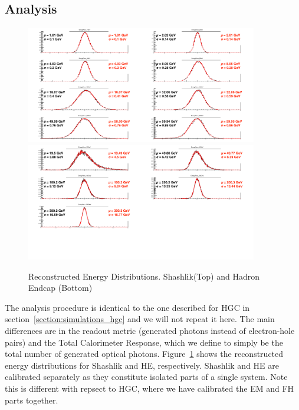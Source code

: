 \subsection{Analysis}
\begin{figure}[!h]
    \centering
    \includegraphics[width=0.9\textwidth]{figures/ch_simulations/shashlik/performance/EnergyRecoDistributions.png}
    \includegraphics[width=0.9\textwidth]{figures/ch_simulations/he/performance/EnergyRECODistributions.png}
    \caption{Reconstructed Energy Distributions. Shashlik(Top) and Hadron Endcap (Bottom)}
    \label{fig:simulations_shashlikhe_energyreco}
 \end{figure}
The analysis procedure is identical to the one described for HGC in section~\ref{section:simulations_hgc} and we will not repeat it here. The main differences are in the readout metric (generated photons instead of electron-hole pairs) and the Total Calorimeter Response, which we define to simply be the total number of generated optical photons. Figure~\ref{fig:simulations_shashlikhe_energyreco} shows the reconstructed energy distributions for Shashlik and HE, respectively. Shashlik and HE are calibrated separately as they constitute isolated parts of a single system. Note this is different with repsect to HGC, where we have calibrated the EM and FH parts together.


